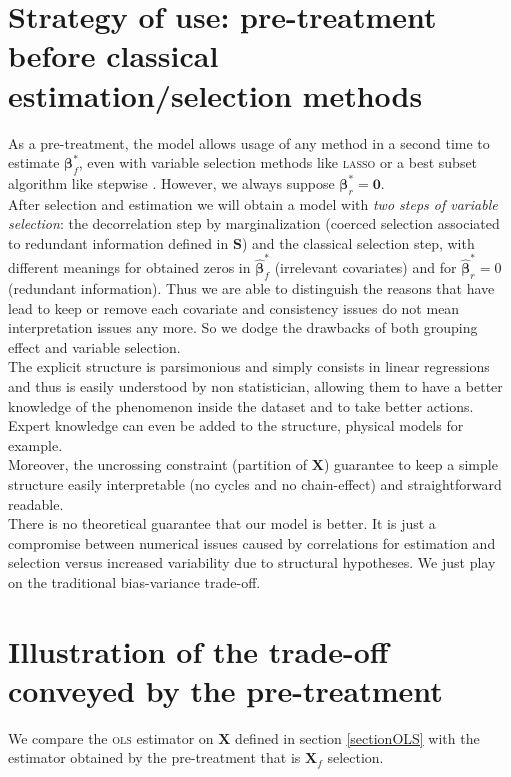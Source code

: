 \documentclass[12pt,a4paper]{report}
\begin{document}
\section{Strategy of use: pre-treatment before classical estimation/selection methods}\label{interpretation}

As a pre-treatment, the model allows usage of any method in a second time to estimate $\boldsymbol{\beta}_{f}^*$, even with variable selection methods like \textsc{lasso} or a best subset algorithm like stepwise \cite{seber2012linear}. However, we always suppose $\boldsymbol{\beta}^*_r=\boldsymbol{0}$.\\

After selection and estimation we will obtain a model with { \it two steps of variable selection}: the decorrelation step by marginalization (coerced selection associated to redundant information defined in $\boldsymbol{S}$) and the classical selection step, with different meanings for obtained zeros in $\hat{\boldsymbol{\beta}}^*_{f}$ (irrelevant covariates) and for $\hat{\boldsymbol{\beta}}^*_{r}=0$ (redundant information). 
 Thus we are able to distinguish the reasons that have lead to keep or remove each covariate and consistency issues do not mean interpretation issues any more. So we dodge the drawbacks of both grouping effect and variable selection.\\


The explicit structure is parsimonious and simply consists in linear regressions and thus is easily understood by non statistician, allowing them to have a better knowledge of the phenomenon inside the dataset and to take better actions. Expert knowledge can even be added to the structure, physical models for example.\\

Moreover, the uncrossing constraint (partition of $\boldsymbol{X}$) guarantee to keep a simple structure easily interpretable (no cycles and no chain-effect) and straightforward readable.\\
	
			There is no theoretical guarantee that our model is better. It is just a compromise between numerical issues caused by correlations for estimation and selection versus increased variability due to structural hypotheses. We just play on the traditional bias-variance trade-off. 
			

	\section{Illustration of the trade-off conveyed by the pre-treatment}	
	We compare the \textsc{ols} estimator on $\boldsymbol{X}$ defined in section \ref{sectionOLS} with the estimator obtained by the pre-treatment that is $\boldsymbol{X}_f$ selection.
  
\end{document}

